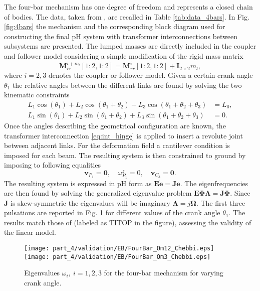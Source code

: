The four-bar mechanism has one degree of freedom and represents a closed chain of bodies. The data, taken from \cite{kitis1990natural,chebbi2017}, are recalled in Table \ref{tab:data_4bars}. In Fig. \ref{fig:4bars} the mechanism and the corresponding block diagram used for constructing the final pH system with transformer interconnections between subsystems are presented. The lumped masses are directly included in the coupler and follower model considering a simple modification of the rigid mass matrix
\begin{equation*}
\mathbf{M}_{rr}^{i + m_l}[1:2,1:2] = \mathbf{M}_{rr}^{i}[1:2,1:2] + \mathbf{I}_{2\times 2} m_l,
\end{equation*} 
where $i=2,3$ denotes the coupler or follower model. Given a certain crank angle $\theta_1$ the relative angles between the different links are found by solving the two kinematic constraints
\begin{align*}
L_1 \cos(\theta_1)+ L_2 \cos(\theta_1+\theta_2)+ L_3 \cos(\theta_1+\theta_2+\theta_3) &=L_0, \\
L_1 \sin(\theta_1)+L_2 \sin(\theta_1+\theta_2)+L_3 \sin(\theta_1+\theta_2+\theta_3) &=0.
\end{align*} 
Once the angles describing the geometrical configuration are known, the transformer interconnection \eqref{eq:int_hinge} is applied to insert a revolute joint between adjacent links. For the deformation field a cantilever condition is imposed for each beam. The resulting system is then constrained to ground by imposing to following equalities
\begin{equation*}
\mathbf{v}_{P_1} = \mathbf{0}, \quad \omega^z_{P_1} = 0, \quad \mathbf{v}_{C_3} = \mathbf{0}.
\end{equation*}
The resulting system is expressed in pH form as $\mathbf{E}\dot{\mathbf{e}} = \mathbf{J} \mathbf{e}$. The eigenfrequencies are then found by solving the generalized eigenvalue problem $\mathbf{E}\bm{\Phi \Lambda} = \mathbf{J} \bm{\Phi}$. Since $\mathbf{J}$ is skew-symmetric the eigenvalues will be imaginary $\bm{\Lambda} = j \bm{\Omega}$. The first three pulsations  are reported in Fig. \ref{fig:omega_4bars} for different values of the crank angle $\theta_1$. The results match those of \cite{chebbi2017} (labeled as TITOP in the figure), assessing the validity of the linear model.

\begin{figure}[tb]
	\centering
	\texttt{[image: part\_4/validation/EB/FourBar\_Om12\_Chebbi.eps]} 
	\texttt{[image: part\_4/validation/EB/FourBar\_Om3\_Chebbi.eps]} 
	\caption{Eigenvalues $\omega_i, \ i=1,2,3$ for the four-bar mechanism for varying crank angle.}
	\label{fig:omega_4bars}
\end{figure}

